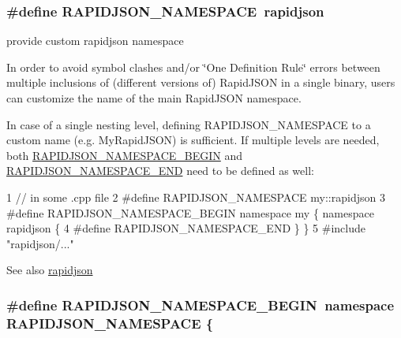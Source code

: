 \subsubsection[{\texorpdfstring{R\+A\+P\+I\+D\+J\+S\+O\+N\+\_\+\+N\+A\+M\+E\+S\+P\+A\+CE}{RAPIDJSON_NAMESPACE}}]{\setlength{\rightskip}{0pt plus 5cm}\#define R\+A\+P\+I\+D\+J\+S\+O\+N\+\_\+\+N\+A\+M\+E\+S\+P\+A\+CE~rapidjson}\hypertarget{group___r_a_p_i_d_j_s_o_n___c_o_n_f_i_g_ga743a79d3af927391fe3eb5c979136899}{}\label{group___r_a_p_i_d_j_s_o_n___c_o_n_f_i_g_ga743a79d3af927391fe3eb5c979136899}


provide custom rapidjson namespace 

In order to avoid symbol clashes and/or \char`\"{}\+One Definition Rule\char`\"{} errors between multiple inclusions of (different versions of) Rapid\+J\+S\+ON in a single binary, users can customize the name of the main Rapid\+J\+S\+ON namespace.

In case of a single nesting level, defining {\ttfamily R\+A\+P\+I\+D\+J\+S\+O\+N\+\_\+\+N\+A\+M\+E\+S\+P\+A\+CE} to a custom name (e.\+g. {\ttfamily My\+Rapid\+J\+S\+ON}) is sufficient. If multiple levels are needed, both \hyperlink{group___r_a_p_i_d_j_s_o_n___c_o_n_f_i_g_gad3806c8251fdc7da9618b7e922674ffc}{R\+A\+P\+I\+D\+J\+S\+O\+N\+\_\+\+N\+A\+M\+E\+S\+P\+A\+C\+E\+\_\+\+B\+E\+G\+IN} and \hyperlink{group___r_a_p_i_d_j_s_o_n___c_o_n_f_i_g_gaf18f052a98b9f5df5448d39484b743c1}{R\+A\+P\+I\+D\+J\+S\+O\+N\+\_\+\+N\+A\+M\+E\+S\+P\+A\+C\+E\+\_\+\+E\+ND} need to be defined as well\+:


\begin{DoxyCode}
1 // in some .cpp file
2 #define RAPIDJSON\_NAMESPACE my::rapidjson
3 #define RAPIDJSON\_NAMESPACE\_BEGIN namespace my \{ namespace rapidjson \{
4 #define RAPIDJSON\_NAMESPACE\_END   \} \}
5 #include "rapidjson/..."
\end{DoxyCode}


\begin{DoxySeeAlso}{See also}
\hyperlink{namespacerapidjson}{rapidjson} 
\end{DoxySeeAlso}
\subsubsection[{\texorpdfstring{R\+A\+P\+I\+D\+J\+S\+O\+N\+\_\+\+N\+A\+M\+E\+S\+P\+A\+C\+E\+\_\+\+B\+E\+G\+IN}{RAPIDJSON_NAMESPACE_BEGIN}}]{\setlength{\rightskip}{0pt plus 5cm}\#define R\+A\+P\+I\+D\+J\+S\+O\+N\+\_\+\+N\+A\+M\+E\+S\+P\+A\+C\+E\+\_\+\+B\+E\+G\+IN~namespace {\bf R\+A\+P\+I\+D\+J\+S\+O\+N\+\_\+\+N\+A\+M\+E\+S\+P\+A\+CE} \{}\hypertarget{group___r_a_p_i_d_j_s_o_n___c_o_n_f_i_g_gad3806c8251fdc7da9618b7e922674ffc}{}\label{group___r_a_p_i_d_j_s_o_n___c_o_n_f_i_g_gad3806c8251fdc7da9618b7e922674ffc}


